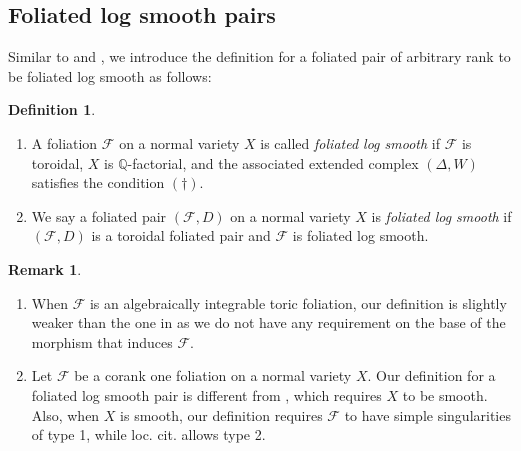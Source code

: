 \documentclass[12pt,reqno]{amsart}
\theoremstyle{definition}
\newtheorem{definition}[theorem]{Definition}
\newtheorem{remark}[theorem]{Remark}
\newcommand{\mc}{\mathcal}
\newcommand\cF{{\mathcal{F}}}
\newcommand\bQ{{\mathbb Q}}
\begin{document}
\subsection{Foliated log smooth pairs}
Similar to \cite[Definition 3.1]{CS} and \cite[Section 3.2]{ambro2021positivity}, we introduce the definition for a foliated pair of arbitrary rank to be foliated log smooth as follows: 
\begin{definition}\label{LogSmAnyRank}
\begin{enumerate}
\item
A foliation $\cF$ on a normal variety $X$ is called \emph{foliated log smooth} if $\cF$ is toroidal, $X$ is $\bQ$-factorial, and the associated extended complex $(\Delta,W)$ satisfies the condition $(\dagger)$. 

\item
We say a foliated pair $(\cF,D)$ on a normal variety $X$ is \emph{foliated log smooth} if $(\cF,D)$ is a toroidal foliated pair and $\cF$ is foliated log smooth. 
\end{enumerate}
\end{definition}

\begin{remark}\label{inv_log_sm}
    \begin{enumerate}
        \item When $\cF$ is an algebraically integrable toric foliation, our definition is slightly weaker than the one in \cite[Definition 2.17]{das2023acc} as we do not have any requirement on the base of the morphism that induces $\cF$. 
        \item Let $\cF$ be a corank one foliation on a normal variety $X$. 
        Our definition for a foliated log smooth pair is different from \cite[Definition 3.1]{CS}, which requires $X$ to be smooth. Also, when $X$ is smooth, our definition requires $\mc F$ to have simple singularities of type 1, while loc. cit. allows type 2. 
    \end{enumerate}
\end{remark}
\end{document}
